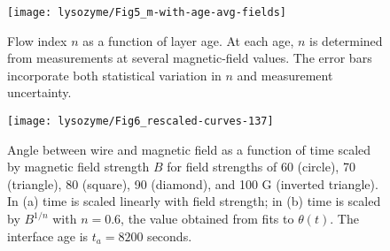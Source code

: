 

\begin{figure}
  \texttt{[image: lysozyme/Fig5\_m-with-age-avg-fields]}
  \caption{\label{fig:m-with-age}Flow index $n$ as a function of layer age. At each age, $n$ is determined from measurements at several magnetic-field values. The error bars incorporate both statistical variation in $n$ and measurement uncertainty.}
\end{figure}




\begin{figure}
 \centerline{\texttt{[image: lysozyme/Fig6\_rescaled-curves-137]}}
 \caption{\label{fig:scaling}Angle between wire and magnetic field as a function of time scaled by magnetic field strength $B$ for field strengths of 60 (circle), 70 (triangle), 80 (square), 90 (diamond), and 100 G (inverted triangle).  In (a) time is scaled linearly with field strength; in (b) time is scaled by $B^{1/n}$ with $n=0.6$, the value obtained from fits to $\theta(t)$. The interface age is $t_a = 8200$ seconds.}
\end{figure}

